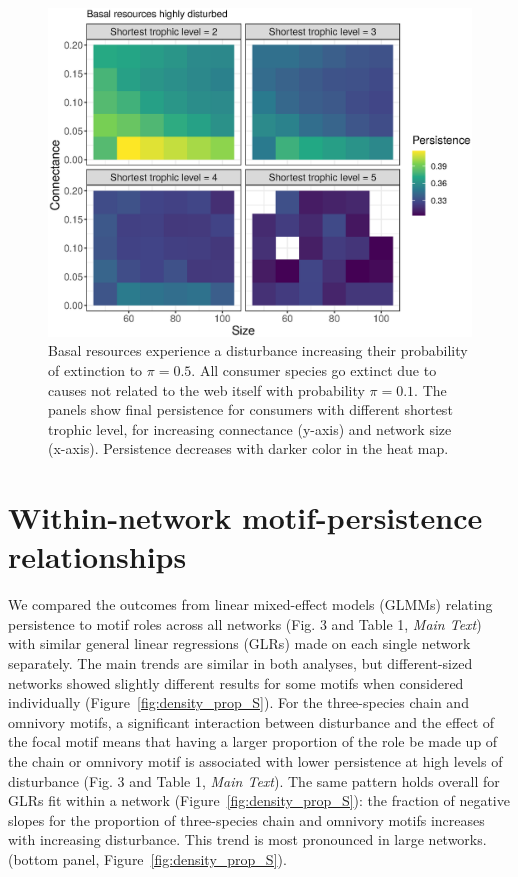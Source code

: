 \documentclass[12pt]{article}
\begin{document}
\begin{spacing}{2.0}
    \begin{figure}[hb!]
     \centering
     \includegraphics[width=.9\textwidth]{figures/heatmap_STL_allCS_BP1.eps}
     \caption{Basal resources experience a disturbance increasing their probability of extinction to $\pi = 0.5$. All consumer species go extinct due to causes not related to the web itself with probability $\pi = 0.1$. The panels show final persistence for consumers with different shortest trophic level, for increasing connectance (y-axis) and network size (x-axis). Persistence decreases with darker color in the heat map.}
     \label{fig:heatmap_stl_BP1}
    \end{figure}

\clearpage

\section{Within-network motif-persistence relationships}

    We compared the outcomes from linear mixed-effect models (GLMMs) relating persistence to motif roles across all networks (Fig. 3 and Table 1, \emph{Main Text}) with similar general linear regressions (GLRs) made on each single network separately.
    The main trends are similar in both analyses, but different-sized networks showed slightly different results for some motifs when considered individually (Figure~\ref{fig:density_prop_S}).
    For the three-species chain and omnivory motifs, a significant interaction between disturbance and the effect of the focal motif means that having a larger proportion of the role be made up of the chain or omnivory motif is associated with lower persistence at high levels of disturbance (Fig. 3 and Table 1, \emph{Main Text}). 
    The same pattern holds overall for GLRs fit within a network  (Figure~\ref{fig:density_prop_S}): the fraction of negative slopes for the proportion of three-species chain and omnivory motifs increases with increasing disturbance. 
    This trend is most pronounced in large networks. (bottom panel, Figure~\ref{fig:density_prop_S}). 
    

\end{spacing}
\end{document}
